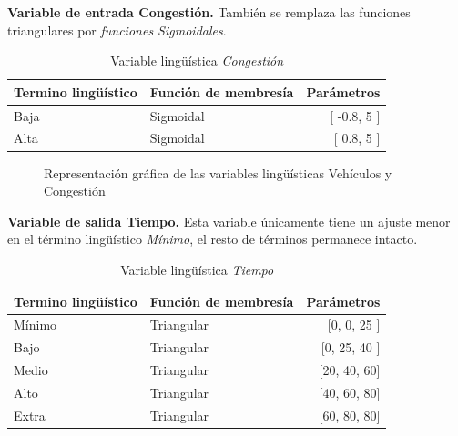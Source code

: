 \textbf{Variable de entrada Congestión.} También se remplaza las funciones triangulares por \textit{funciones Sigmoidales}.

\begin{table}[!h]
	\centering
	\begin{tabular}{llr} \toprule
		Termino lingüístico & Función de membresía & Parámetros \\ \midrule
		Baja & Sigmoidal & [ -0.8, 5 ] \\
		Alta & Sigmoidal & [ 0.8, 5 ] \\ \bottomrule
	\end{tabular}
	\caption{Variable lingüística \textit{Congestión}}
\end{table}
\begin{figure}[H]
	\centering
	\caption[Gráficas de las variables lingüísticas vehículos y congestión]{Representación gráfica de las variables lingüísticas Vehículos y Congestión }
\end{figure}

\textbf{Variable de salida Tiempo.} Esta variable únicamente tiene un ajuste menor en el término lingüístico \textit{Mínimo}, el resto de términos permanece intacto.

\begin{table}[!h]
	\centering
	\begin{tabular}{llr} \toprule
		Termino lingüístico & Función de membresía & Parámetros \\ \midrule
		Mínimo & Triangular & [0, 0, 25 ] \\
		Bajo & Triangular & [0, 25, 40 ] \\
		Medio & Triangular & [20, 40, 60] \\
		Alto & Triangular & [40, 60, 80] \\
		Extra & Triangular & [60, 80, 80] \\ \bottomrule
	\end{tabular}
	\caption{Variable lingüística \textit{Tiempo}}
\end{table}

